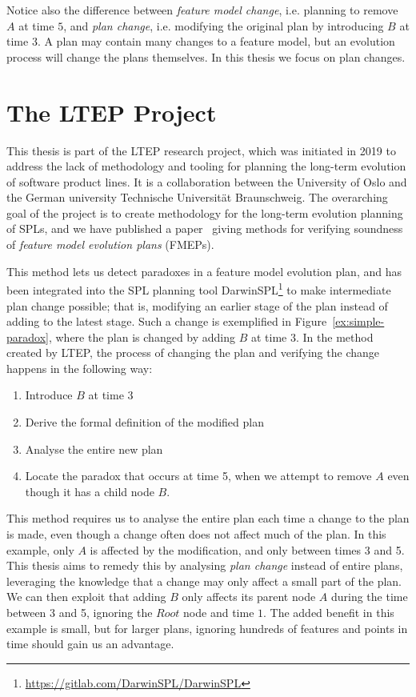 Notice also the difference between \emph{feature model change}, i.e. planning to remove $A$ at time $5$, and \emph{plan change}, i.e. modifying the original plan by introducing $B$ at time 3. A plan may contain many changes to a feature model, but an evolution process will change the plans themselves. In this thesis we focus on plan changes.

\section{The LTEP Project}
\label{sec:the-ltep-project}
This thesis is part of the LTEP research project, which was initiated in 2019 to address the lack of methodology and tooling for planning the long-term evolution of software product lines. It is a collaboration between the University of Oslo and the German university Technische Universität Braunschweig. The overarching goal of the project is to create methodology for the long-term evolution planning of SPLs, and we have published a paper~\cite{art:consistency-preserving-evolution-planning} giving methods for verifying soundness of \emph{feature model evolution plans} (FMEPs). 

This method lets us detect paradoxes in a feature model evolution plan, and has been integrated into the SPL planning tool DarwinSPL\footnote{\url{https://gitlab.com/DarwinSPL/DarwinSPL}} to make intermediate plan change possible; that is, modifying an earlier stage of the plan instead of adding to the latest stage. Such a change is exemplified in Figure~\vref{ex:simple-paradox}, where the plan is changed by adding $B$ at time $3$. In the method created by LTEP, the process of changing the plan and verifying the change happens in the following way:
\begin{enumerate}[1)]
   \item Introduce $B$ at time $3$
   \item Derive the formal definition of the modified plan
   \item Analyse the entire new plan
   \item Locate the paradox that occurs at time 5, when we attempt to remove $A$ even though it has a child node $B$.
\end{enumerate}
This method requires us to analyse the entire plan each time a change to the plan is made, even though a change often does not affect much of the plan. In this example, only $A$ is affected by the modification, and only between times 3 and 5. This thesis aims to remedy this by analysing \emph{plan change} instead of entire plans, leveraging the knowledge that a change may only affect a small part of the plan. We can then exploit that adding $B$ only affects its parent node $A$ during the time between 3 and 5, ignoring the $Root$ node and time $1$. The added benefit in this example is small, but for larger plans, ignoring hundreds of features and points in time should gain us an advantage.

